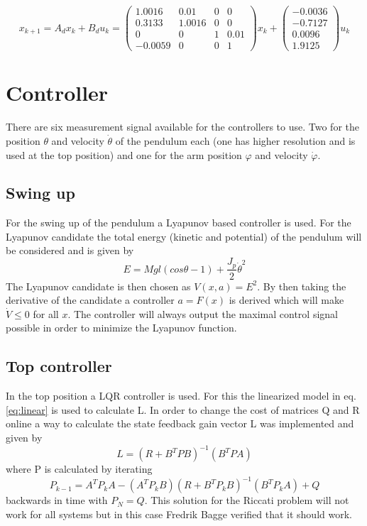\documentclass[10pt,a4paper]{article}
\begin{document}
\begin{equation}
x_{k+1} = A_dx_k + B_du_k =\begin{pmatrix}
 1.0016 & 0.01 & 0 & 0 \\
 0.3133 & 1.0016 & 0 & 0 \\
 0 & 0 & 1 & 0.01 \\
 -0.0059 & 0 & 0 & 1 
\end{pmatrix}x_k + \begin{pmatrix}
-0.0036\\
-0.7127\\
 0.0096\\
 1.9125
 \end{pmatrix}u_k
 \label{eq:discrete}
\end{equation}

\section{Controller}
There are six measurement signal available for the controllers to use. Two for the position $ \theta $ and velocity $ \dot{\theta} $ of the pendulum each (one has higher resolution and is used at the top position) and one for the arm position $ \varphi $ and velocity $ \dot{\varphi} $.
\subsection{Swing up}
For the swing up of the pendulum a Lyapunov based controller is used. For the Lyapunov candidate the total energy (kinetic and potential) of the pendulum will be considered and is given by 
\begin{equation}
E= Mgl(cos\theta - 1)+\frac{J_p}{2}\dot\theta^2
\label{eq:energy}
\end{equation}
The Lyapunov candidate is then chosen as $V(x,a)=E^2$. By then taking the derivative of the candidate a controller $a=F(x)$ is derived which will make $\dot V \leq 0$ for all $x$. The controller will always output the maximal control signal possible in order to minimize the Lyapunov function.
\subsection{Top controller}
In the top position a LQR controller is used. For this the linearized model in eq. \ref{eq:linear} is used to calculate L. In order to change the cost of matrices Q and R online a way to calculate the state feedback gain vector L was implemented and given by
$$ L = (R+B^TPB)^{-1}(B^TPA) $$
where P is calculated by iterating
$$ P_{k-1} = A^TP_kA-(A^TP_kB)(R+B^TP_kB)^{-1}(B^TP_kA)+Q $$
backwards in time with $P_N = Q$. This solution for the Riccati problem will not work for all systems but in this case Fredrik Bagge verified that it should work.
\end{document}
